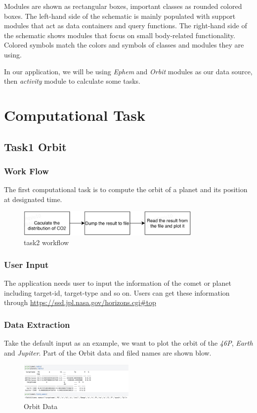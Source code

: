 \documentclass{report}
\begin{document}
Modules are shown as rectangular boxes, important classes as rounded colored boxes. The left-hand side of the schematic is mainly populated with support modules that act as data containers and query functions. The right-hand side of the schematic shows modules that focus on small body-related functionality. Colored symbols match the colors and symbols of classes and modules they are using.

In our application, we will be using \emph{Ephem} and \emph{Orbit} modules as our data source, then \emph{activity} module to calculate some tasks.

\chapter{Computational Task}
\section{Task1 Orbit}
\subsection{Work Flow}
The first computational task is to compute the orbit of a planet and its position at designated time.
\begin{figure}[htb]
    \centering
    \includegraphics[width=0.8\textwidth]{task2}
    \caption{task2 workflow}
    \label{fig:task2}
\end{figure}

\subsection{User Input}
The application needs user to input the information of the comet or planet including target-id, target-type and so on. Users can get these information through \url{https://ssd.jpl.nasa.gov/horizons.cgi#top}
\subsection{Data Extraction}
Take the default input as an example, we want to plot the orbit of the \emph{46P}, \emph{Earth} and \emph{Jupiter}.
Part of the Orbit data and filed names are shown blow.
\begin{figure}[htb]
    \centering
    \includegraphics[width=0.5\textwidth]{DataExtraction}
    \caption{Orbit Data}
    \label{fig:OrbitData}
\end{figure}
\end{document}
